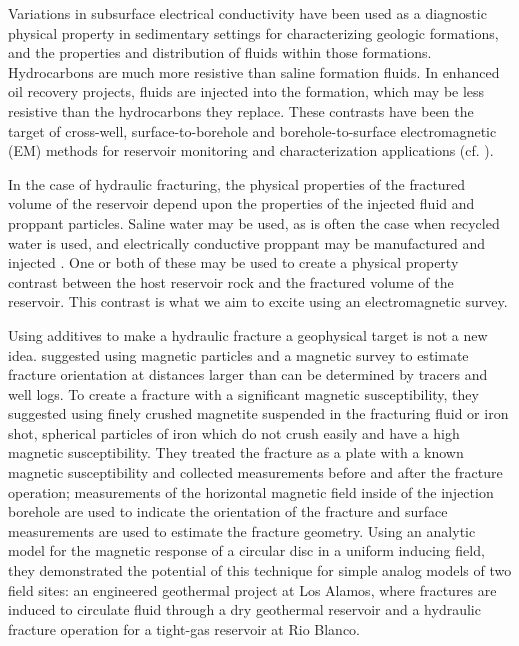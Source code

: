 Variations in subsurface electrical conductivity have been used as a diagnostic physical property in sedimentary settings for characterizing geologic formations, and the properties and distribution of fluids within those formations. Hydrocarbons are much more resistive than saline formation fluids. In enhanced oil recovery projects, fluids are injected into the formation, which may be less resistive than the hydrocarbons they replace. These contrasts have been the target of cross-well, surface-to-borehole and borehole-to-surface electromagnetic (EM) methods for reservoir monitoring and characterization applications (cf. \cite{Bevc1991, Wilt1995, marsala2008, marsala2011, Marsala2014}).

In the case of hydraulic fracturing, the physical properties of the fractured volume of the reservoir depend upon the properties of the injected fluid and proppant particles. Saline water may be used, as is often the case when recycled water is used, and electrically conductive proppant may be manufactured and injected \citep{cannan2014electrically, Vengosh2014, King2010}. One or both of these may be used to create a physical property contrast between the host reservoir rock and the fractured volume of the reservoir. This contrast is what we aim to excite using an electromagnetic survey.

Using additives to make a hydraulic fracture a geophysical target is not a new idea. \cite{Byerlee1976} suggested using magnetic particles and a magnetic survey to estimate fracture orientation at distances larger than can be determined by tracers and well logs. To create a fracture with a significant magnetic susceptibility, they suggested using finely crushed magnetite suspended in the fracturing fluid or iron shot, spherical particles of iron which do not crush easily and have a high magnetic susceptibility. They treated the fracture as a plate with a known magnetic susceptibility and collected measurements before and after the fracture operation; measurements of the horizontal magnetic field inside of the injection borehole are used to indicate the orientation of the fracture and surface measurements are used to estimate the fracture geometry. Using an analytic model for the magnetic response of a circular disc in a uniform inducing field, they demonstrated the potential of this technique for simple analog models of two field sites: an engineered geothermal project at Los Alamos, where fractures are induced to circulate fluid through a dry geothermal reservoir and a hydraulic fracture operation for a tight-gas reservoir at Rio Blanco.

